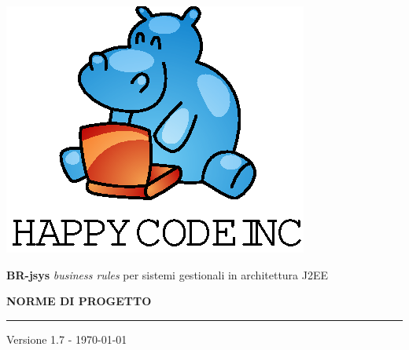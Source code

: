 \documentclass[11pt,titlepage,a4paper]{report}
\begin{document}
\newcommand{\lv}{1.7 } %



\begin{titlepage}
\begin{center}
\vspace*{0.5in}
\includegraphics{logo.eps}
\vspace*{0.2in}

{\Large \textbf{BR-jsys}}
{\Large \emph{business rules} per sistemi gestionali in architettura J2EE } 
\vspace{2in}

\LARGE \textbf {NORME DI PROGETTO}
\par\rule{10cm}{0.4pt} \par {\large Versione \lv - \today}


\end{center}
\end{titlepage}
\vspace*{0.5in}
\end{document}
